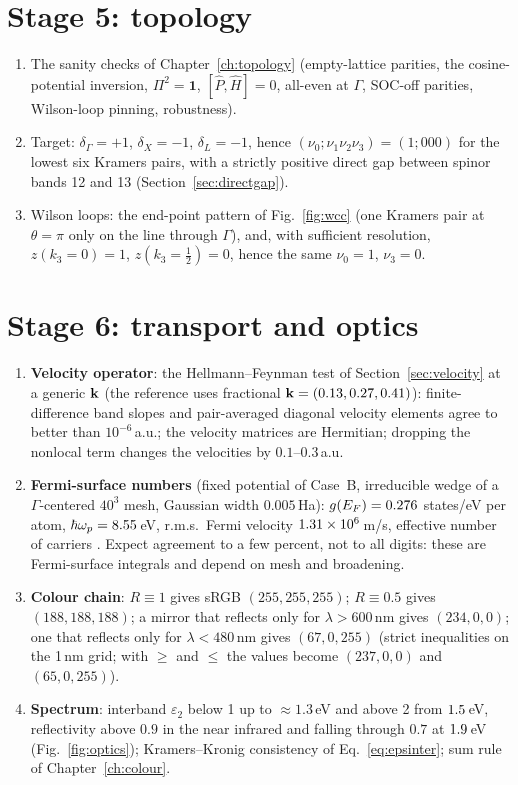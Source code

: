 \section{Stage 5: topology}
\begin{enumerate}[leftmargin=2em]
\item The sanity checks of Chapter~\ref{ch:topology} (empty-lattice
parities, the cosine-potential inversion, $\Pi^2 = \mathbf 1$,
$[\hat P,\hat H] = 0$, all-even at $\Gamma$, SOC-off parities,
Wilson-loop pinning, robustness).
\item Target: $\delta_\Gamma = +1$, $\delta_X = -1$, $\delta_L = -1$,
hence $(\nu_0;\nu_1\nu_2\nu_3) = (1;000)$ for the lowest six Kramers
pairs, with a strictly positive direct gap between spinor bands 12 and 13
(Section~\ref{sec:directgap}).
\item Wilson loops: the end-point pattern of Fig.~\ref{fig:wcc} (one
Kramers pair at $\theta=\pi$ only on the line through $\Gamma$), and,
with sufficient resolution, $z(k_3{=}0) = 1$, $z(k_3{=}\tfrac12) = 0$,
hence the same $\nu_0 = 1$, $\nu_3 = 0$.
\end{enumerate}

\section{Stage 6: transport and optics}
\begin{enumerate}[leftmargin=2em]
\item \textbf{Velocity operator}: the Hellmann--Feynman test of
Section~\ref{sec:velocity} at a generic $\mathbf{k}$ (the reference uses
fractional $\mathbf{k} = (0.13, 0.27, 0.41)$): finite-difference band slopes and
pair-averaged diagonal velocity elements agree to better than
$10^{-6}$\,a.u.; the
velocity matrices are Hermitian; dropping the nonlocal term changes the
velocities by $0.1$--$0.3$\,a.u.
\item \textbf{Fermi-surface numbers} (fixed potential of Case~B,
irreducible wedge of a $\Gamma$-centered $40^3$ mesh, Gaussian width
$0.005$\,Ha): $g(E_F) = 0.276$ states/eV per atom,
$\hbar\omega_p = 8.55$\,eV, r.m.s.\ Fermi velocity
$1.31\times10^{6}$\,m/s, effective number of carriers \NEFF. Expect
agreement to a few percent, not to all digits: these are Fermi-surface
integrals and depend on mesh and broadening.
\item \textbf{Colour chain}: $R\equiv1$ gives sRGB $(255,255,255)$;
$R\equiv0.5$ gives $(188,188,188)$; a mirror that reflects only for
$\lambda > 600$\,nm gives $(234,0,0)$; one that reflects only for
$\lambda < 480$\,nm gives $(67,0,255)$ (strict inequalities on the 1\,nm
grid; with $\ge$ and $\le$ the values become $(237,0,0)$ and
$(65,0,255)$).
\item \textbf{Spectrum}: interband $\varepsilon_2$ below 1 up to
$\approx1.3$\,eV and above 2 from $1.5$\,eV, reflectivity above $0.9$ in
the near infrared and falling through $0.7$ at $1.9$\,eV
(Fig.~\ref{fig:optics}); Kramers--Kronig consistency of
Eq.~\eqref{eq:epsinter}; sum rule of Chapter~\ref{ch:colour}.
\end{enumerate}


